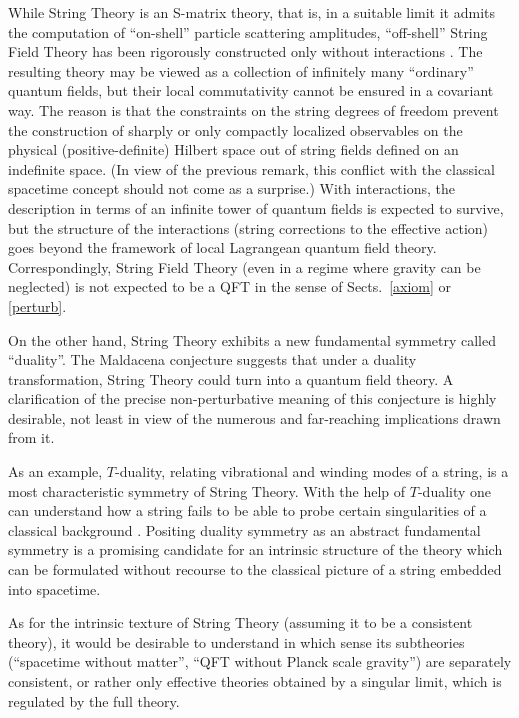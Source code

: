 \documentclass[multphys,vecphys]{svmult}
\begin{document}
While String Theory is an S-matrix theory, that is, in a suitable
limit it admits the computation of ``on-shell'' particle
scattering amplitudes, ``off-shell'' String Field
Theory has been rigorously constructed only without interactions
\cite{Dim}. The resulting theory may be viewed as a collection of
infinitely many ``ordinary'' quantum fields, but their
local commutativity cannot be ensured in a covariant 
way. The reason is that the constraints on the string degrees of
freedom prevent the construction of sharply or only compactly
localized observables on the physical (positive-definite)
Hilbert space out of string fields defined on an
indefinite space. (In view of the previous remark, this conflict with
the classical spacetime concept should not  come as a surprise.) With
interactions, the description in terms of an infinite tower of quantum
fields is expected to survive, but the structure of the interactions
(string corrections to the effective action) goes beyond the framework of
local Lagrangean quantum field theory. Correspondingly, String Field
Theory (even in a regime where gravity can be neglected) is not
expected to be a QFT in the sense of Sects.~\ref{axiom} or
\ref{perturb}.  

On the other hand, String Theory exhibits a new fundamental symmetry
called ``duality''. The Maldacena conjecture suggests that under a
duality transformation, String Theory could turn into a quantum field
theory. A clarification of the precise non-perturbative meaning of
this conjecture is highly desirable, not least in view of the numerous
and far-reaching implications drawn from it.

As an example, $T$-duality, relating vibrational and winding modes of a
string, is a most characteristic symmetry of String Theory. With the
help of $T$-duality one can understand how a string fails to be able
to probe certain singularities of a classical
background \cite{Hor}. Positing duality symmetry as
an abstract fundamental symmetry is a promising candidate for an
intrinsic structure of the theory which can be formulated without
recourse to the classical picture of a string embedded into spacetime.  

As for the intrinsic texture of String Theory (assuming it to be a
consistent theory), it would be desirable to understand in which sense 
its subtheories (``spacetime without matter'', ``QFT without Planck
scale gravity'') are separately consistent, or rather only
effective theories obtained by a singular
limit, which is regulated by the full theory.  
\end{document}
